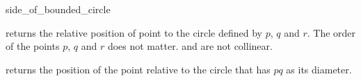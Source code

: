 \begin{ccRefFunction}{side_of_bounded_circle}

         {returns the relative position of point 
          to the circle defined by $p$, $q$ and $r$. The order
          of the points $p$, $q$ and $r$ does not matter.
          \ccPrecond {} and  are not collinear.}

  {returns the position of the point  relative to the circle
   that has $pq$ as its diameter.}

\ccSeeAlso
{} \\
 \\

\end{ccRefFunction}
